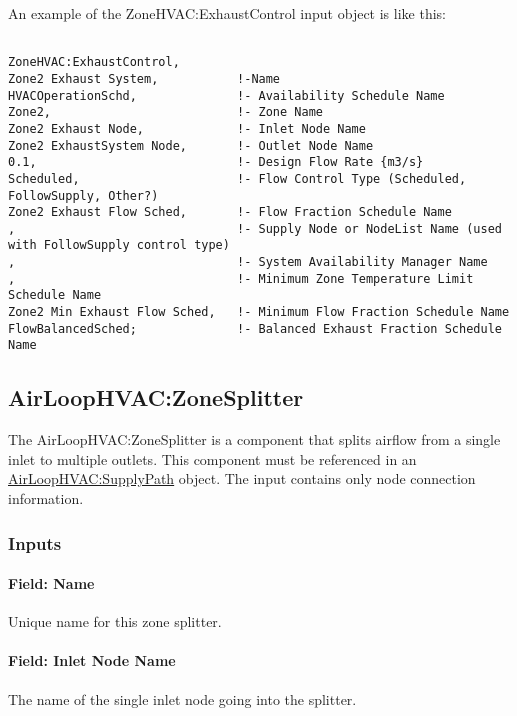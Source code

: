 An example of the ZoneHVAC:ExhaustControl input object is like this:

\begin{lstlisting}

ZoneHVAC:ExhaustControl,
Zone2 Exhaust System,           !-Name
HVACOperationSchd,              !- Availability Schedule Name
Zone2,                          !- Zone Name
Zone2 Exhaust Node,             !- Inlet Node Name
Zone2 ExhaustSystem Node,       !- Outlet Node Name
0.1,                            !- Design Flow Rate {m3/s}
Scheduled,                      !- Flow Control Type (Scheduled, FollowSupply, Other?)
Zone2 Exhaust Flow Sched,       !- Flow Fraction Schedule Name
,                               !- Supply Node or NodeList Name (used with FollowSupply control type)
,                               !- System Availability Manager Name
,                               !- Minimum Zone Temperature Limit Schedule Name
Zone2 Min Exhaust Flow Sched,   !- Minimum Flow Fraction Schedule Name
FlowBalancedSched;              !- Balanced Exhaust Fraction Schedule Name

\end{lstlisting}

\subsection{AirLoopHVAC:ZoneSplitter}\label{airloophvaczonesplitter}

The AirLoopHVAC:ZoneSplitter is a component that splits airflow from a single inlet to multiple outlets. This component must be referenced in an \hyperref[airloophvacsupplypath]{AirLoopHVAC:SupplyPath} object. The input contains only node connection information.

\subsubsection{Inputs}

\paragraph{Field: Name}

Unique name for this zone splitter.

\paragraph{Field: Inlet Node Name}

The name of the single inlet node going into the splitter.

